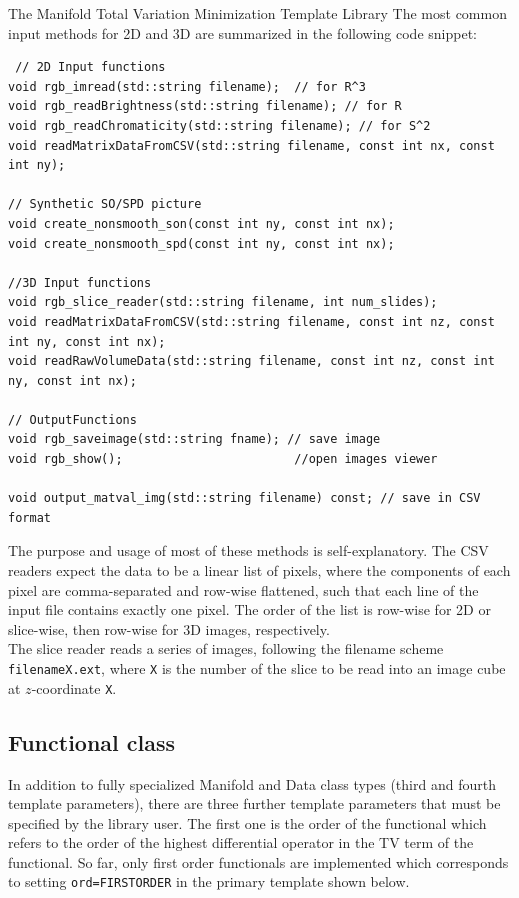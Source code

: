 \begin{chapter}{The Manifold Total Variation Minimization Template Library}
The most common input methods for 2D and 3D are summarized in the following code snippet:
\cppinline
\begin{lstlisting}
 // 2D Input functions
void rgb_imread(std::string filename);	// for R^3
void rgb_readBrightness(std::string filename); // for R
void rgb_readChromaticity(std::string filename); // for S^2
void readMatrixDataFromCSV(std::string filename, const int nx, const int ny);

// Synthetic SO/SPD picture 
void create_nonsmooth_son(const int ny, const int nx);
void create_nonsmooth_spd(const int ny, const int nx);
 
//3D Input functions
void rgb_slice_reader(std::string filename, int num_slides); 
void readMatrixDataFromCSV(std::string filename, const int nz, const int ny, const int nx);
void readRawVolumeData(std::string filename, const int nz, const int ny, const int nx);

// OutputFunctions
void rgb_saveimage(std::string fname); // save image
void rgb_show();						//open images viewer
	
void output_matval_img(std::string filename) const; // save in CSV format
\end{lstlisting}
The purpose and usage of most of these methods is self-explanatory. The CSV readers expect the data to be a linear list of pixels, where the components of each pixel are
comma-separated and row-wise flattened, such that each line of the input file contains exactly one pixel. The order of the list is row-wise for 2D or slice-wise, then row-wise for 3D images,
respectively. \\ 
The slice reader reads a series of images, following the filename scheme \texttt{filenameX.ext}, where \texttt{X} is the number of the slice to be read into an image cube at $z$-coordinate
\texttt{X}.

\subsection{Functional class} %
\label{sub:Functional class}
In addition to fully specialized Manifold and Data class types (third and fourth template parameters),
there are three further template parameters that must be specified by the library user. The first one
is the order of the functional which refers to the order of the highest differential operator in the TV term of the functional.
So far, only first order functionals are implemented which corresponds to setting \texttt{ord=FIRSTORDER} in the primary template shown below.


\end{chapter}
